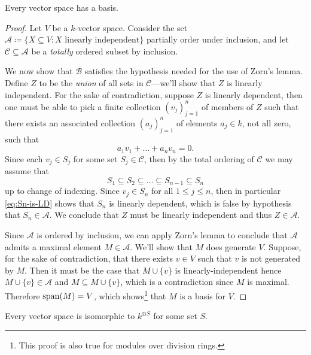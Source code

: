 \begin{theorem}
Every vector space has a basis.
\end{theorem}

\begin{proof}
Let \(V\) be a \(k\)-vector space. Consider the set
\(\mathcal A \coloneq \{X \subseteq V \colon X \text{ linearly independent}\}\)
partially order under inclusion, and let \(\mathcal C \subseteq \mathcal A\) be
a \emph{totally} ordered subset by inclusion.

We now show that \(\mathcal B\) satisfies the hypothesis needed for the use of
Zorn's lemma. Define \(Z\) to be the \emph{union} of all sets in
\(\mathcal C\)---we'll show that \(Z\) is linearly independent. For the sake of
contradiction, suppose \(Z\) is linearly dependent, then one must be able to
pick a finite collection \((v_j)_{j=1}^n\) of members of \(Z\) such that there
exists an associated collection \((a_j)_{j=1}^n\) of elements \(a_j \in k\), not
all zero, such that
\begin{equation}\label{eq:Sn-is-LD}
a_1 v_1 + \dots + a_n v_n = 0.
\end{equation}
Since each \(v_j \in S_j\) for some set \(S_j \in \mathcal{C}\), then by the
total ordering of \(\mathcal{C}\) we may assume that
\[
S_1 \subseteq S_2 \subseteq \dots \subseteq S_{n-1} \subseteq S_n
\]
up to change of indexing. Since \(v_j \in S_n\) for all \(1 \leq j \leq n\),
then in particular \cref{eq:Sn-is-LD} shows that \(S_n\) is linearly dependent,
which is false by hypothesis that \(S_n \in \mathcal{A}\). We conclude that
\(Z\) must be linearly independent and thus \(Z \in \mathcal{A}\).

Since \(\mathcal{A}\) is ordered by inclusion, we can apply Zorn's lemma to
conclude that \(\mathcal{A}\) admits a maximal element \(M \in
\mathcal{A}\). We'll show that \(M\) does generate \(V\). Suppose, for the sake
of contradiction, that there exists \(v \in V\) such that \(v\) is not generated
by \(M\). Then it must be the case that \(M \cup \{v\}\) is linearly-independent
hence \(M \cup \{v\} \in \mathcal{A}\) and \(M \subseteq M \cup \{v\}\), which
is a contradiction since \(M\) is maximal. Therefore \(\operatorname{span}(M) = V\), which
shows\footnote{This proof is also true for
  modules over division rings.} that \(M\) is a basis for \(V\).
\end{proof}

\begin{corollary}
Every vector space is isomorphic to \(k^{\oplus S}\) for some set \(S\).
\end{corollary}

